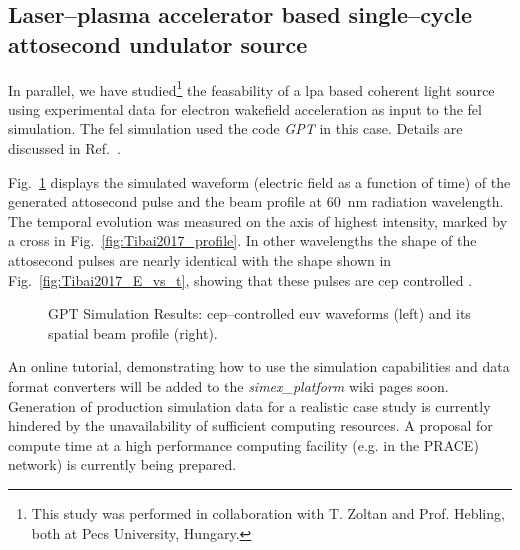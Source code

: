 \subsection{Laser--plasma accelerator based single--cycle attosecond undulator source}
In parallel, we have studied\footnote{This study was performed in collaboration
with T. Zoltan and Prof. Hebling, both at Pecs University, Hungary.} the feasability of a \gls{lpa} based coherent light
source using experimental data for electron wakefield acceleration as input to
the \gls{fel} simulation. The \gls{fel} simulation used the code \textit{GPT} in this case.
Details are discussed in Ref.~\cite{Tibai2017}.

Fig.~\ref{fig:Tibai2017} displays the simulated waveform (electric field as
a function of time)  of the generated attosecond
pulse and the beam profile at \SI{60}{\nano\metre} radiation wavelength. The
temporal evolution was measured on the axis of highest intensity, marked by  a
cross in Fig.~\ref{fig:Tibai2017_profile}. In other
wavelengths the shape of the attosecond pulses are nearly identical with the
shape shown in Fig.~\ref{fig:Tibai2017_E_vs_t}, showing that these pulses are
\gls{cep} controlled \cite{Tibai2017}.
%
\begin{figure}[ht]
  \caption{GPT Simulation Results: \gls{cep}--controlled \gls{euv} waveforms (left) and its spatial beam
    profile (right).}
    \label{fig:Tibai2017}
\end{figure}
%
An online tutorial, demonstrating how to use the simulation capabilities and
data format converters will be added to the \textit{simex\_platform} wiki pages
soon. Generation of production simulation data for a realistic case study
is currently hindered by the unavailability of sufficient computing resources. A
proposal for compute time at a high performance computing facility (e.g. in the
PRACE) network) is currently being prepared.
